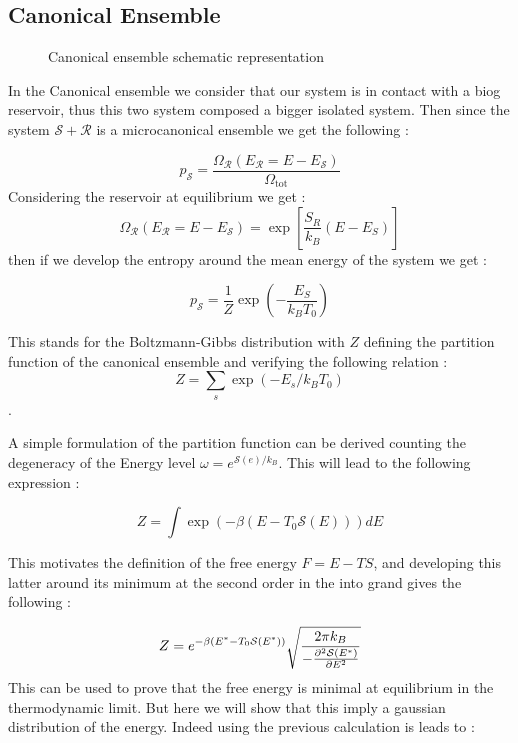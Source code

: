 \documentclass[ansiapaper]{report}
\begin{document}
\begin{multicols}{3}
\section{Canonical Ensemble}

\begin{figure}[H]
		\def\svgwidth{\linewidth}
        
        \caption{Canonical ensemble schematic representation}
\end{figure}

In the Canonical ensemble we consider that our system is in contact with a biog reservoir, thus this two system composed a bigger isolated system. Then since the system $\mathcal{S} + \mathcal{R}$ is a microcanonical ensemble we get the following : 

$$ p_\mathcal{S} = \frac{\Omega_\mathcal{R}(E_\mathcal{R} =  E - E_\mathcal{S})}{\Omega_{\text{tot}}}$$
Considering the reservoir at equilibrium we get : 
$$\Omega_\mathcal{R}(E_\mathcal{R} =  E - E_\mathcal{S}) = \exp \left[ \frac{S_R}{k_B}(E - E_S)\right] $$
then if we develop the entropy around the mean energy of the system we get : 

$$ p_\mathcal{S} = \frac{1}{Z}\exp \left( - \frac{E_S}{k_B T_0}\right)$$

This stands for the Boltzmann-Gibbs distribution with $Z$ defining the partition function of the canonical ensemble and verifying the following relation : 
$$ Z = \sum_s \exp(-E_s / k_B T_0) $$.

A simple formulation of the partition function can be derived counting the degeneracy of the Energy level $\omega = e^{\mathcal{S}(e)/k_B}$. This will lead to the following expression : 

\begin{equation}
    Z = \int \exp(-\beta (E - T_0 \mathcal{S}(E))) dE
    \label{eq:partition_canonical}
\end{equation}

This motivates the definition of the free energy $F = E - T S$, and developing this latter around its minimum at the second order in the into grand gives the following : 

\begin{equation}
    Z = e^{-\beta (E^* - T_0 \mathcal{S}(E^*))}\sqrt{\frac{2\pi k_B}{- \pdv[2]{\mathcal{S}(E^*)}{E}}} 
    \label{eq:partition_canonical_2}
\end{equation}
This can be used to prove that the free energy is minimal at equilibrium in the thermodynamic limit. But here we will show that this imply a gaussian distribution of the energy.  Indeed using the previous calculation is leads to : 


\end{multicols}
\end{document}
